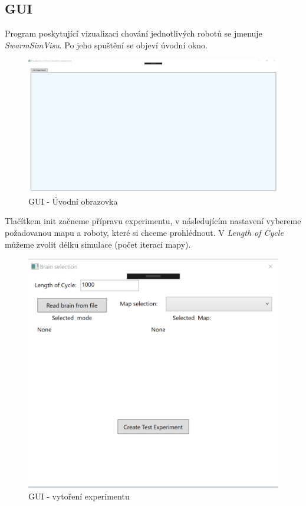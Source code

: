 \documentclass[12pt, oneside]{article}
\begin{document}
\subsection{GUI}
Program poskytující vizualizaci chování jednotlivých robotů se jmenuje \textit{SwarmSimVisu}. Po jeho spuštění se objeví úvodní okno.
\begin{figure}[h]\centering
		\includegraphics[width=\columnwidth]{img/start.png}
		\caption{GUI - Úvodní obrazovka} 
\end{figure} 
\clearpage
Tlačítkem init začneme přípravu experimentu, v následujícím nastavení vybereme požadovanou mapu a roboty, které si chceme prohlédnout. V \textit{Length of Cycle} můžeme zvolit délku simulace (počet iterací mapy). 
\par
\begin{figure}[h]\centering
	\includegraphics[width=\columnwidth]{img/brain_sel.png}
	\caption{GUI - vytoření experimentu} 
\end{figure} 
\end{document}
